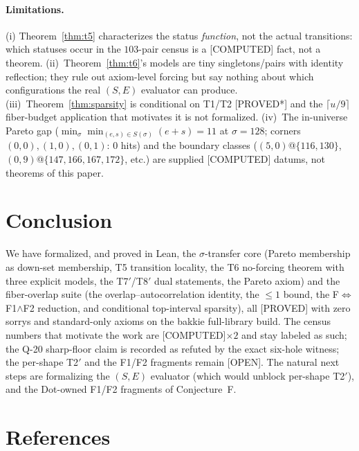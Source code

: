 \documentclass[11pt,a4paper]{article}
\theoremstyle{definition}
\begin{document}
\paragraph{Limitations.} (i) Theorem~\ref{thm:t5} characterizes the
status \emph{function}, not the actual transitions: which statuses occur
in the $103$-pair census is a [COMPUTED] fact, not a theorem.
(ii)~Theorem~\ref{thm:t6}'s models are tiny singletons/pairs with
identity reflection; they rule out axiom-level forcing but say nothing
about which configurations the real $(S,E)$ evaluator can produce.
(iii)~Theorem~\ref{thm:sparsity} is conditional on T1/T2 [PROVED*] and
the $\lceil u/9\rceil$ fiber-budget application that motivates it is
not formalized. (iv)~The in-universe Pareto gap
($\min_\sigma\min_{(e,s)\in S(\sigma)}(e+s)=11$ at $\sigma=128$;
corners $(0,0),(1,0),(0,1)$: $0$ hits) and the boundary classes
($(5,0)$@$\{116,130\}$, $(0,9)$@$\{147,166,167,172\}$, etc.) are
supplied [COMPUTED] datums, not theorems of this paper.

\section{Conclusion}

We have formalized, and proved in Lean, the $\sigma$-transfer core
(Pareto membership as down-set membership, T5 transition locality, the
T6 no-forcing theorem with three explicit models, the T7$'$/T8$'$ dual
statements, the Pareto axiom) and the fiber-overlap suite (the
overlap--autocorrelation identity, the $\le1$ bound, the F$\iff$F1$\land$F2
reduction, and conditional top-interval sparsity), all [PROVED] with
zero sorrys and standard-only axioms on the bakkie full-library build.
The census numbers that motivate the work are [COMPUTED]$\times2$ and
stay labeled as such; the Q-20 sharp-floor claim is recorded as
refuted by the exact six-hole witness; the per-shape T2$'$ and the F1/F2
fragments remain [OPEN]. The natural next steps are formalizing the
$(S,E)$ evaluator (which would unblock per-shape T2$'$), and the
Dot-owned F1/F2 fragments of Conjecture~F.

\section{References}
\end{document}
